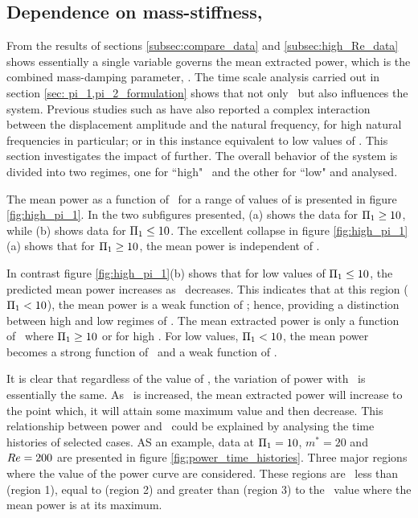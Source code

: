 \subsection{Dependence on mass-stiffness, \massstiff}
\label{subsec:dependence pi_1}



From the results of sections \ref{subsec:compare_data} and \ref{subsec:high_Re_data} shows essentially a single variable governs the mean extracted power, which is the combined mass-damping parameter, \massdamp. The time scale analysis carried out in  section \ref{sec: pi_1,pi_2_formulation} shows that not only \massdamp \ but also \massstiff influences the system. Previous studies such as \cite{bouclin:77} have also reported a complex interaction between the displacement amplitude and the natural frequency, for high natural frequencies in particular; or in this instance equivalent to low values of \massstiff.  This section investigates the impact of \massstiff further. The overall behavior of the system is divided into two regimes, one for ``high" \massstiff \ and the other for ``low" \massstiff and analysed.

The mean power as a function of \massdamp \ for a range of values of \massstiff is presented in figure \ref{fig:high_pi_1}. In the two subfigures presented, (a) shows the data for $\Pi_1 \geq 10$, while (b) shows data for $\Pi_1 \leq 10$.  The excellent collapse in figure \ref{fig:high_pi_1}(a) shows that for $\Pi_1 \geq 10$, the mean power is independent of \massstiff.

In contrast figure \ref{fig:high_pi_1}(b) shows that for low values of $\Pi_1 \leq 10$, the predicted mean power increases as \massdamp \ decreases. This indicates that at this region ($\Pi_1 < 10$), the mean power is a weak function of \massstiff; hence, providing a distinction between high and low regimes of \massstiff. The mean extracted power is only a function of \massdamp \ where $\Pi_1 \geq 10$ or for high \massstiff. For low values, $\Pi_1 < 10$, the mean power becomes a strong function of \massdamp \ and a weak function of \massstiff.

It is clear that regardless of the value of \massstiff, the variation of power with \massdamp \ is essentially the same. As \massdamp \ is increased, the mean extracted power will increase to the point which, it will attain some maximum value and then decrease. This relationship between power and \massdamp \ could be explained by analysing the time histories of selected cases. 
AS an example, data at $\Pi_1=10$, $m^*=20$ and $Re=200$ are presented in figure \ref{fig:power_time_histories}. Three major regions where the value of the power curve are considered. These regions are \massdamp\ less than (region 1), equal to (region 2) and greater than (region 3) to the \massdamp\ value where the mean power is at its maximum.


